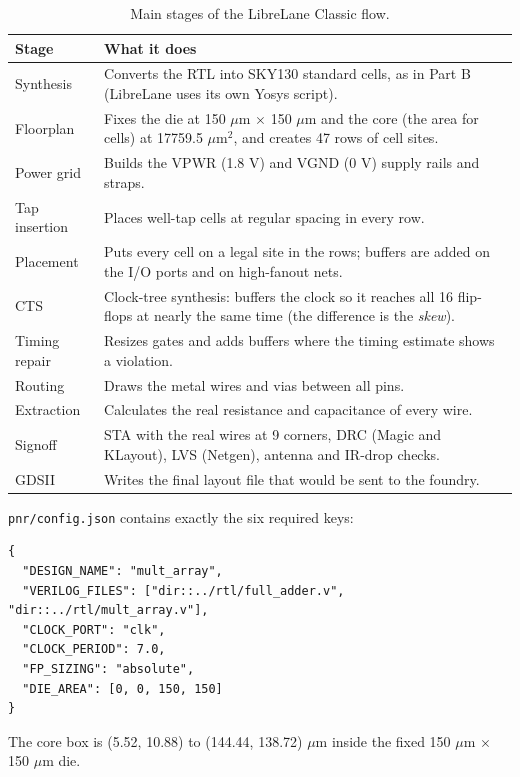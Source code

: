 \documentclass[10pt,a4paper,twocolumn]{article}
\newcommand{\um}{$\mu$m}
\newcommand{\umsq}{$\mu$m$^2$}
\begin{document}
\begin{table}[!htbp]
\centering
\small
\begin{tabularx}{\columnwidth}{lY}
\toprule
\textbf{Stage} & \textbf{What it does} \\
\midrule
Synthesis & Converts the RTL into SKY130 standard cells, as in Part B (LibreLane uses its own Yosys script). \\
Floorplan & Fixes the die at 150 \um{} $\times$ 150 \um{} and the core (the area for cells) at 17759.5 \umsq, and creates 47 rows of cell sites. \\
Power grid & Builds the VPWR (1.8 V) and VGND (0 V) supply rails and straps. \\
Tap insertion & Places well-tap cells at regular spacing in every row. \\
Placement & Puts every cell on a legal site in the rows; buffers are added on the I/O ports and on high-fanout nets. \\
CTS & Clock-tree synthesis: buffers the clock so it reaches all 16 flip-flops at nearly the same time (the difference is the \emph{skew}). \\
Timing repair & Resizes gates and adds buffers where the timing estimate shows a violation. \\
Routing & Draws the metal wires and vias between all pins. \\
Extraction & Calculates the real resistance and capacitance of every wire. \\
Signoff & STA with the real wires at 9 corners, DRC (Magic and KLayout), LVS (Netgen), antenna and IR-drop checks. \\
GDSII & Writes the final layout file that would be sent to the foundry. \\
\bottomrule
\end{tabularx}
\caption{Main stages of the LibreLane Classic flow.}\label{tab:stages}
\end{table}

\texttt{pnr/config.json} contains exactly the six required keys:

\begin{lstlisting}[frame=none, xleftmargin=1.5em]
{
  "DESIGN_NAME": "mult_array",
  "VERILOG_FILES": ["dir::../rtl/full_adder.v", "dir::../rtl/mult_array.v"],
  "CLOCK_PORT": "clk",
  "CLOCK_PERIOD": 7.0,
  "FP_SIZING": "absolute",
  "DIE_AREA": [0, 0, 150, 150]
}
\end{lstlisting}

The core box is (5.52, 10.88) to (144.44, 138.72) \um{} inside the fixed 150 \um{} $\times$ 150 \um{} die.
\end{document}
